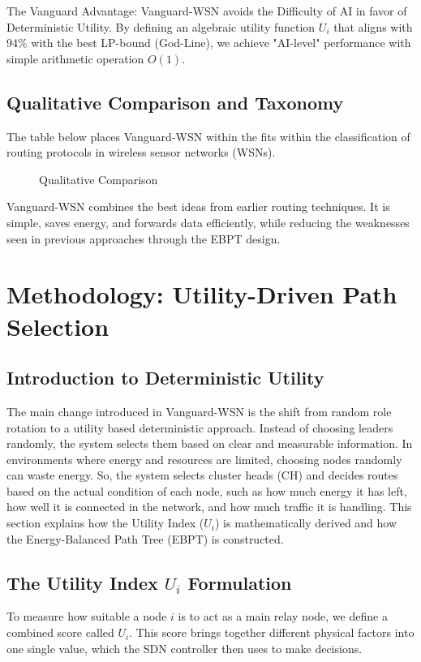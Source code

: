 \documentclass[conference]{IEEEtran}
\begin{document}
The Vanguard Advantage: Vanguard-WSN avoids the Difficulty of AI in favor of Deterministic Utility. By defining an algebraic utility function $U_i$ that aligns with 94\% with the best LP-bound (God-Line), we achieve "AI-level" performance with simple arithmetic operation $O(1)$.

\subsection{Qualitative Comparison and Taxonomy}
The table below places Vanguard-WSN within the fits within the classification of routing protocols in wireless sensor networks (WSNs).

\begin{figure}[htbp]
\centerline{}
\caption{Qualitative Comparison}
\label{tab_qual}
\end{figure}

Vanguard-WSN combines the best ideas from earlier routing techniques. It is simple, saves energy, and forwards data efficiently, while reducing the weaknesses seen in previous approaches through the EBPT design.

\section{Methodology: Utility-Driven Path Selection}

\subsection{Introduction to Deterministic Utility}
The main change introduced in Vanguard-WSN is the shift from random role rotation to a utility based deterministic approach. Instead of choosing leaders randomly, the system selects them based on clear and measurable information. In environments where energy and resources are limited, choosing nodes randomly can waste energy. So, the system selects cluster heads (CH) and decides routes based on the actual condition of each node, such as how much energy it has left, how well it is connected in the network, and how much traffic it is handling. This section explains how the Utility Index ($U_i$) is mathematically derived and how the Energy-Balanced Path Tree (EBPT) is constructed.

\subsection{The Utility Index $U_i$ Formulation}
To measure how suitable a node $i$ is to act as a main relay node, we define a combined score called $U_i$. This score brings together different physical factors into one single value, which the SDN controller then uses to make decisions.
\end{document}
